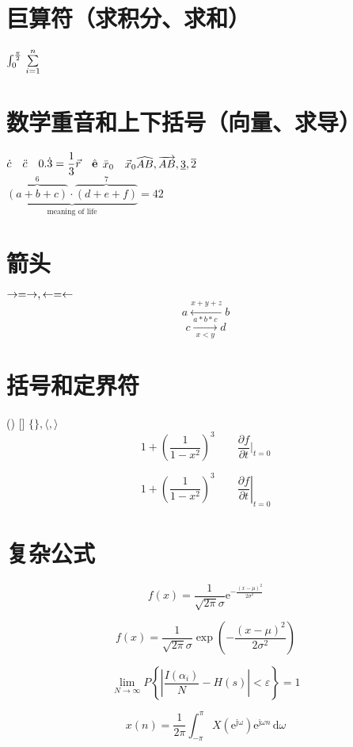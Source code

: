 \documentclass[12pt]{article}
\begin{document}
	
	\section{巨算符（求积分、求和）}
	\noindent
	$\int_0^{\frac{\pi}{2}} \\
	\sum\limits_{i=1}^n$
	
	
	\section{数学重音和上下括号（向量、求导）}
	\noindent
	$\dot{c} \quad \ddot{c} \quad 0.\dot{3}=\dfrac{1}{3}\\
	\vec{r} \quad \hat{\mathbf{e}}\\$
	$\bar{x}_0 \quad \vec{x}_0\\
	\widehat{AB},\overrightarrow{AB},\underline{3},\overline{2}$\\
	$\underbrace{\overbrace{(a+b+c)}^6 \cdot \overbrace{(d+e+f)}^7}_\text{meaning of life}=42$
	
	
	\section{箭头}
	\noindent
	$\rightarrow = \to, \leftarrow = \gets\\$
	\[
	a\xleftarrow{x+y+z} b\]
	\[c\xrightarrow[x<y]{a*b*c} d\]
	
	\section{括号和定界符}
	\noindent
	() [] $\{ \}, \langle, \rangle$
	\[1 + (\frac{1}{1-x^{2}})^3 \qquad
	\frac{\partial f}{\partial t}|_{t=0}\]
	
	\[1 + \left(\frac{1}{1-x^{2}}\right)^3 \qquad
	\left.\frac{\partial f}{\partial t}\right|_{t=0}\]
	
	\section{复杂公式}
	\[ f(x)=
	\frac{1}{\sqrt{2\pi}\sigma}\mathrm{e}^{-\frac{(x-\mu)^2}{2 \sigma^2}}
	\]
	
	\[ f(x)=
	\frac{1}{\sqrt{2\pi}\sigma}\exp \left(-\frac{(x-\mu)^2}{2 \sigma^2}\right )
	\]
	
	\[ \lim\limits_{N \rightarrow \infty} P \left\{\left|\frac{I(\alpha_i)}{N}-H(s)\right|<\varepsilon\right\}=1 \]
	
	\[ x(n)=\frac{1}{2\pi}\int_{-\pi}^{\pi}{X(\mathrm{e}^ \mathrm{j\omega})\mathrm{e}^ {\mathrm{j}\omega n}}\, \mathrm{d}\omega
	\]
\end{document}
